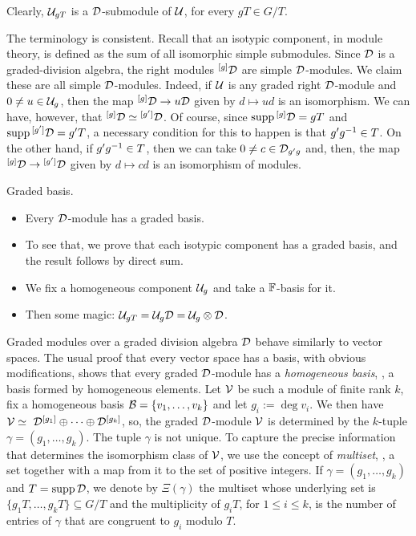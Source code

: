 Clearly, $\mathcal U_{gT}$ is a $\mathcal{D}$-submodule of $\mathcal U$, for every $gT \in G/T$.

\begin{remark}
    The terminology is consistent. 
    Recall that an isotypic component, in module theory, is defined as the sum of all isomorphic simple submodules. 
    Since $\mathcal{D}$ is a graded-division algebra, the right modules ${}^{[g]}\mathcal{D}$ are simple $\mathcal{D}$-modules. 
    We claim these are all simple $\mathcal{D}$-modules. Indeed, if $\mathcal U$ is any graded right $\mathcal{D}$-module and $0\neq u \in \mathcal U_g$, then the map ${}^{[g]}\mathcal{D} \to u\mathcal{D}$ given by $d \mapsto ud$ is an isomorphism. 
    We can have, however, that ${}^{[g]}\mathcal{D}\simeq {}^{[g']}\mathcal{D}$. 
    Of course, since $\operatorname{supp} {}^{[g]}\mathcal{D} = gT$ and $\operatorname{supp} {}^{[g']}\mathcal{D} = g'T$, a necessary condition for this to happen is that $g'g^{-1} \in T$. 
    On the other hand, if $g'g^{-1} \in T$, then we can take $0\neq c \in \mathcal{D}_{g'g}$ and, then, the map ${}^{[g]}\mathcal{D} \to {}^{[g']}\mathcal{D}$ given by $d \mapsto cd$ is an isomorphism of modules.
\end{remark}

\begin{defi}
    Graded basis.
\end{defi}

\begin{itemize}
    \item Every $\mathcal{D}$-module has a graded basis.
    \item To see that, we prove that each isotypic component has a graded basis, and the result follows by direct sum.
    \item We fix a homogeneous component $\mathcal U_g$ and take a $\mathbb{F}$-basis for it.
    \item Then some magic: $\mathcal U_{gT} = \mathcal U_g\mathcal{D} = \mathcal U_g \otimes \mathcal{D}$.
\end{itemize}

Graded modules over a graded division algebra $\mathcal D$ behave similarly to vector spaces. The usual proof that every vector space has a basis, with obvious modifications, shows that every graded $\mathcal D$-module has a \emph{homogeneous basis}, \ie, a basis formed by homogeneous elements.
Let $\mathcal V$ be such a module of finite rank $k$, fix a homogeneous basis $\mathcal B = \{v_1, \ldots, v_k\}$ and let $g_i := \operatorname{deg} v_i$. We then have $\mc{V}\iso \ \D^{[g_1]}\oplus\cdots\oplus\D^{[g_k]}$, so, the graded $\mathcal D$-module $\mathcal V$ is determined by the $k$-tuple $\gamma = (g_1,\ldots, g_k)$. The tuple $\gamma$ is not unique. To capture the precise information that determines the isomorphism class of $\mathcal V$, we use the concept of \emph{multiset}, \ie, a set together with a map from it to the set of positive integers. If $\gamma = (g_1,\ldots, g_k)$ and $T=\operatorname{supp} \mathcal{D}$, we denote by $\Xi(\gamma)$ the multiset whose underlying set is $\{g_1 T,\ldots, g_k T\} \subseteq G/T$ and the multiplicity of $g_i T$, for $1\leq i\leq k$, is the number of entries of $\gamma$ that are congruent to $g_i$ modulo $T$.

